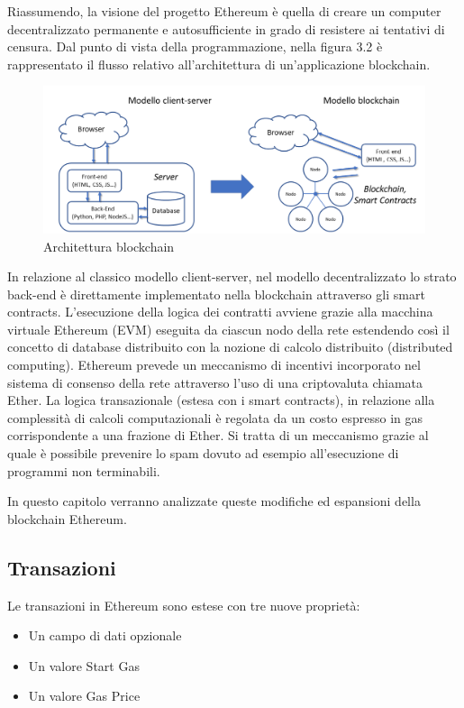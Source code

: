 Riassumendo, la visione del progetto Ethereum è quella di creare un computer decentralizzato permanente e autosufficiente in grado di resistere ai tentativi di censura. Dal punto di vista della programmazione, nella figura 3.2 è rappresentato il flusso relativo all’architettura di un’applicazione blockchain.

\begin{figure}[H]
\centering
\includegraphics[width=1\textwidth]{immagini/architetturav1.png}
\caption{Architettura blockchain}
\label{fig:mesh8}
\end{figure}

In relazione al classico modello client-server, nel modello decentralizzato lo strato back-end è direttamente implementato nella blockchain attraverso gli smart contracts. L’esecuzione della logica dei contratti avviene grazie alla macchina virtuale Ethereum (EVM) eseguita da ciascun nodo della rete estendendo così il concetto di database distribuito con la nozione di calcolo distribuito (distributed computing).  Ethereum prevede un meccanismo di incentivi incorporato nel sistema di consenso della rete attraverso l’uso di una criptovaluta chiamata Ether. La logica transazionale (estesa con i smart contracts), in relazione alla complessità di calcoli computazionali è regolata da un costo espresso in gas corrispondente a una frazione di Ether. Si tratta di un meccanismo grazie al quale è possibile prevenire lo spam dovuto ad esempio all’esecuzione di programmi non terminabili. 

In questo capitolo verranno analizzate queste modifiche ed espansioni della blockchain Ethereum.

\subsection{Transazioni}

Le transazioni in Ethereum sono estese con tre nuove proprietà:

\begin{itemize}
\item Un campo di dati opzionale
\item Un valore Start Gas
\item Un valore Gas Price
\end{itemize}


